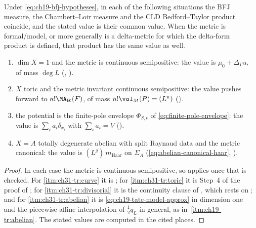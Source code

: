 \begin{corollary}
\label{cor:ch31-four-families-transfer}
Under \eqref{eq:ch19-bfj-hypotheses}, in each of the following situations
the BFJ measure, the Chambert--Loir measure and the CLD Bedford--Taylor
product coincide, and the stated value is their common value.  When the
metric is formal/model, or more generally is a delta-metric for which the
delta-form product is defined, that product has the same value as well.
\begin{enumerate}
\item\label{itm:ch31-tr:curve} \(\dim X=1\) and the metric is continuous
 semipositive: the value is \(\mu_0+\Delta_\Gamma u\), of mass
 \(\deg L\) (,
 ).
\item\label{itm:ch31-tr:toric} \(X\) toric and the metric invariant
 continuous semipositive: the value pushes forward to
 \(n!\MA_{\mathbf R}(F)\), of mass \(n!\vol_M(P)=(L^n)\)
 ().
\item\label{itm:ch31-tr:divisorial} the potential is the finite-pole
 envelope \(\Phi_{S,t}\) of \eqref{eq:finite-pole-envelope}: the value is
 \(\sum_ia_i\delta_{x_i}\) with \(\sum_ia_i=V\)
 ().
\item\label{itm:ch31-tr:abelian} \(X=A\) totally degenerate abelian with
 split Raynaud data and the metric canonical: the value is
 \((L^g)\,m_{\mathrm{Haar}}\) on \(\Sigma_A\)
 (\eqref{eq:abelian-canonical-haar},
 ).
\end{enumerate}
\end{corollary}

\begin{proof}
In each case the metric is continuous semipositive, so
 applies once that is checked.
For \cref{itm:ch31-tr:curve} it is
; for \cref{itm:ch31-tr:toric} it is Step~4 of
the proof of ; for
\cref{itm:ch31-tr:divisorial} it is the continuity clause of
, which rests on
; and for \cref{itm:ch31-tr:abelian} it is
\eqref{eq:ch19-tate-model-approx} in dimension one and the piecewise affine
interpolation of \(\tfrac12q_L\) in general, as in
\,\cref{itm:ch19-tr:abelian}.  The stated values are
computed in the cited places.
\end{proof}

